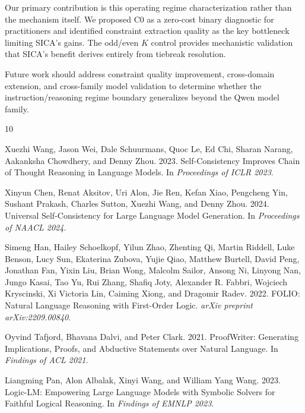 \documentclass[11pt,a4paper]{article}
\begin{document}
Our primary contribution is this operating regime characterization rather than the mechanism itself. We proposed C0 as a zero-cost binary diagnostic for practitioners and identified constraint extraction quality as the key bottleneck limiting SICA's gains. The odd/even $K$ control provides mechanistic validation that SICA's benefit derives entirely from tiebreak resolution.

Future work should address constraint quality improvement, cross-domain extension, and cross-family model validation to determine whether the instruction/reasoning regime boundary generalizes beyond the Qwen model family.



\begin{thebibliography}{10}

Xuezhi Wang, Jason Wei, Dale Schuurmans, Quoc Le, Ed Chi, Sharan Narang, Aakanksha Chowdhery, and Denny Zhou. 2023.
\newblock Self-Consistency Improves Chain of Thought Reasoning in Language Models.
\newblock In \emph{Proceedings of ICLR 2023}.

Xinyun Chen, Renat Aksitov, Uri Alon, Jie Ren, Kefan Xiao, Pengcheng Yin, Sushant Prakash, Charles Sutton, Xuezhi Wang, and Denny Zhou. 2024.
\newblock Universal Self-Consistency for Large Language Model Generation.
\newblock In \emph{Proceedings of NAACL 2024}.

Simeng Han, Hailey Schoelkopf, Yilun Zhao, Zhenting Qi, Martin Riddell, Luke Benson, Lucy Sun, Ekaterina Zubova, Yujie Qiao, Matthew Burtell, David Peng, Jonathan Fan, Yixin Liu, Brian Wong, Malcolm Sailor, Ansong Ni, Linyong Nan, Jungo Kasai, Tao Yu, Rui Zhang, Shafiq Joty, Alexander R. Fabbri, Wojciech Kryscinski, Xi Victoria Lin, Caiming Xiong, and Dragomir Radev. 2022.
\newblock FOLIO: Natural Language Reasoning with First-Order Logic.
\newblock \emph{arXiv preprint arXiv:2209.00840}.

Oyvind Tafjord, Bhavana Dalvi, and Peter Clark. 2021.
\newblock ProofWriter: Generating Implications, Proofs, and Abductive Statements over Natural Language.
\newblock In \emph{Findings of ACL 2021}.

Liangming Pan, Alon Albalak, Xinyi Wang, and William Yang Wang. 2023.
\newblock Logic-LM: Empowering Large Language Models with Symbolic Solvers for Faithful Logical Reasoning.
\newblock In \emph{Findings of EMNLP 2023}.


\end{thebibliography}
\end{document}
